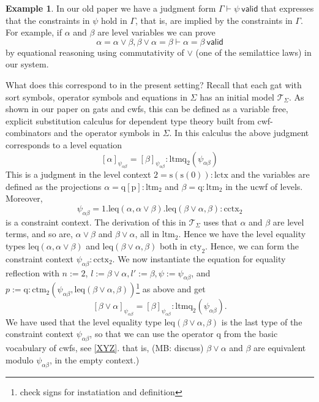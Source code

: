 \documentclass[11pt,a4paper]{article}
\theoremstyle{definition}
\newtheorem{example}{Example}
\newcommand{\valid}{\mathsf{valid}}
\def\psiab{\psi_{\alpha\beta}}
\newcommand{\T}{\mathsf{T}}
\def\lctx{\mathrm{lctx}}
\def\ltm{\mathrm{ltm}}
\def\ltmq{\mathrm{ltmq}}
\def\leq{\mathrm{leq}}
\def\s{\mathrm{s}}
\def\cctx{\mathrm{cctx}}
\def\cty{\mathrm{cty}}
\def\ctm{\mathrm{ctm}}
\def\p{\mathrm{p}}
\def\q{\mathrm{q}}
\def\T{\mathcal{T}}
\begin{document}
\begin{example}\label{exa:cctx-entails-lattice-eqs}
In our old paper we have a judgment form $\Gamma \vdash \psi\ \valid$ that expresses that the constraints in $\psi$
hold in $\Gamma$, that is, are implied by the constraints in $\Gamma$.
For example, if $\alpha$ and $\beta$ are level variables we can prove
$$
\alpha = \alpha\vee\beta, \beta\vee\alpha = \beta \vdash \alpha = \beta\ \valid
$$
by equational reasoning using commutativity of $\vee$ (one of the semilattice laws) in our system.

What does this correspond to in the present setting? Recall that each gat with sort symbols, operator symbols and equations in $\Sigma$ has an initial model $\T_\Sigma$. As shown in our paper on gats and cwfs, this can be defined as a variable free, explicit substitution calculus for dependent type theory built from cwf-combinators and the operator symbols in $\Sigma$\cite{bezem:hofmann}. In this calculus the above judgment corresponds to a level equation
$$
[\alpha]_{\psiab} = [\beta]_{\psiab} : \ltmq_2(\psiab)
$$
This is a judgment in the level context $2 = \s(\s(0)) : \lctx$ and the variables are defined as the projections $\alpha = \q[\p] : \ltm_2$ and $\beta = \q  : \ltm_2$ in the ucwf of levels. Moreover, 
$$
\psiab = 1.\leq(\alpha,\alpha\vee\beta).\leq(\beta\vee\alpha,\beta) : \cctx_2
$$
is a constraint context. The derivation of this in $\T_\Sigma$ uses that 
$\alpha$ and $\beta$ are level terms, and so are, 
$\alpha\vee\beta$ and $\beta\vee\alpha$, all in $\ltm_2$.
Hence we have the level equality types
$\leq(\alpha,\alpha\vee\beta)$ and $\leq(\beta\vee\alpha,\beta)$ both in $\cty_2$. Hence, we can form the constraint context $\psiab : \cctx_2$.
We now instantiate the equation for equality reflection
with $n := 2$, $l :=  \beta\vee\alpha, l':= \beta, \psi:= \psiab$, and $p := \q: \ctm_2(\psiab,\leq(\beta\vee\alpha,\beta))$\footnote{check signs for instatiation and definition}
as above and get 
\[
[\beta\vee\alpha]_{\psiab} = [\beta]_{\psiab} : \ltmq_2(\psiab).
\]
We have used that the
level equality type $\leq(\beta\vee\alpha,\beta)$ is the last type
of the constraint context $\psiab$, so that we can use the operator $\q$ 
from the basic vocabulary of cwfs, see \ref{XYZ}.
that is, (MB: discuss) $\beta\vee\alpha$ and $\beta$ are equivalent
modulo $\psiab$, in the empty context.)


\end{example}
\end{document}
